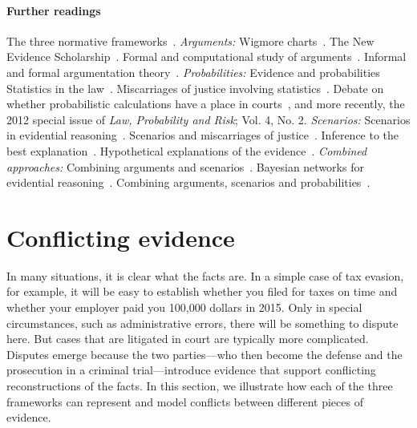 \documentclass[10pt]{article}
\begin{document}

\paragraph{Further readings} 
The three normative frameworks~\citep{andersonEtal2005,kapteinEtal2009,dawidEtal2011}. 
%
\textit{Arguments:} Wigmore charts~\citep{wigmore1913}. The New Evidence Scholarship~\citep{andersonEtal2005}. 
Formal and computational study of arguments~\citep{pollock1987,pollock1995}.
Informal and formal argumentation theory~\citep{vanEemerenEtal2014}.
%
\textit{Probabilities:}
Evidence and probabilities~\citep{schum1994,morteraDawid2007}
Statistics in the law~\citep{fenton2011}. Miscarriages of justice involving statistics~\citep{dawidEtal2011,schnepsColmez2013}.
Debate on whether probabilistic calculations have a place in courts~\citep{finkelsteinFairley1970,tribe1971}, and more recently, 
the 2012 special issue of \textit{Law, Probability and Risk}; Vol. 4, No. 2. 
%
\textit{Scenarios:}
Scenarios in evidential reasoning~\citep{bennettFeldman1981,penningtonHastie1993,penningtonHastie1993StoryModel}. Scenarios and miscarriages of justice~\citep{wagenaarEtal1993}. Inference to the best explanation~\citep{pardoAllen2008}. Hypothetical explanations of the evidence~\citep{thagard1989}. 
%
\textit{Combined approaches:}
Combining arguments and scenarios~\citep{bexEtal2010,bex2011}. 
Bayesian networks for evidential reasoning~\citep{heplerEtal2007,fentonNeilLagnado2013}. 
Combining arguments, scenarios and probabilities~\citep{vlekEtal2016,timmerEtAl2017, verheijEtal2016,verheij2014,verheij2017}. 

\section{Conflicting evidence}
\label{sec:conf}
 	

In many situations, it is clear what the facts are. In a simple case of tax evasion, for example, 
it will be easy to establish whether you filed for taxes on time and whether your employer paid you 100,000 dollars in 2015. Only in special circumstances, 
such as administrative errors, there will be something to dispute here. 
But cases that are litigated in court are typically more complicated.
Disputes emerge because the two parties---who then become the defense and the 
prosecution in a criminal trial---introduce evidence that support conflicting 
reconstructions of the facts. In this section, we illustrate how 
each of the three frameworks can represent and model conflicts 
between different pieces of evidence. 
\end{document}
